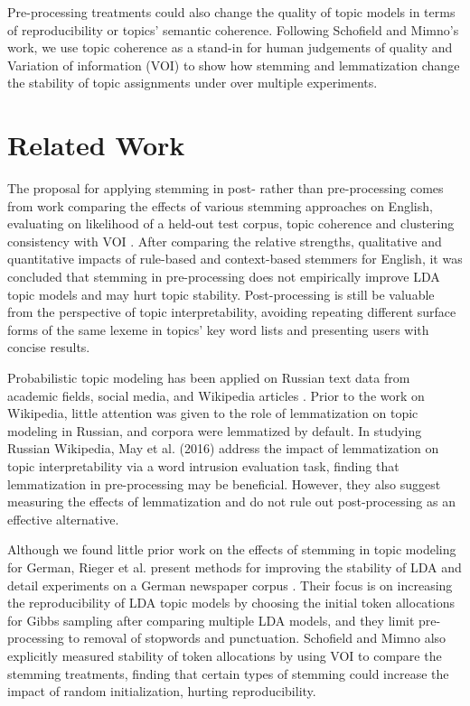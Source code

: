 \documentclass[11pt,a4paper]{article}
\begin{document}
Pre-processing treatments could also change the quality of topic models in terms of reproducibility or topics' semantic coherence. Following Schofield and Mimno's work, we use topic coherence as a stand-in for human judgements of quality \cite{mimno2011optimizing} and Variation of information (VOI) \cite{Meila2003ComparingCB} to show how stemming and lemmatization change the stability of topic assignments under over multiple experiments.


\section{Related Work}
The proposal for applying stemming in post- rather than pre-processing comes from work comparing the effects of various stemming approaches on English, evaluating on likelihood of a held-out test corpus, topic coherence and clustering consistency with VOI \cite{schofield-mimno-2016-comparing}. After comparing the relative strengths, qualitative and quantitative impacts of rule-based and context-based stemmers for English, it was concluded that stemming in pre-processing does not empirically improve LDA topic models and may hurt topic stability. Post-processing is still be valuable from the perspective of topic interpretability, avoiding repeating different surface forms of the same lexeme in topics' key word lists and presenting users with concise results.

Probabilistic topic modeling has been applied on Russian text data from academic fields, social media, and Wikipedia articles \cite{mitrofanova2015probabilistic,koltsova2013,May2016AnAO}. Prior to the work on Wikipedia, little attention was given to the role of lemmatization on topic modeling in Russian, and corpora were lemmatized by default. In studying Russian Wikipedia, May et al. (2016) address the impact of lemmatization on topic interpretability via a word intrusion evaluation task, finding that lemmatization in pre-processing may be beneficial. However, they also suggest measuring the effects of lemmatization and do not rule out post-processing as an effective alternative.

Although we found little prior work on the effects of stemming in topic modeling for German, Rieger et al. present methods for improving the stability of LDA and detail experiments on a German newspaper corpus \cite{Rieger2020ImprovingLD}. Their focus is on increasing the reproducibility of LDA topic models by choosing the initial token allocations for Gibbs sampling after comparing multiple LDA models, and they limit pre-processing to removal of stopwords and punctuation. Schofield and Mimno also explicitly measured stability of token allocations by using VOI to compare the stemming treatments, finding that certain types of stemming could increase the impact of random initialization, hurting reproducibility.
\end{document}
